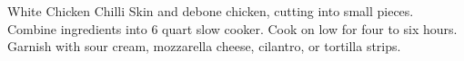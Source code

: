 \begin{recipe}{White Chicken Chilli}{}{}
Skin and debone chicken, cutting into small pieces.
Combine ingredients into 6 quart slow cooker. Cook on low for four to six hours.
Garnish with sour cream, mozzarella cheese, cilantro, or tortilla strips.
\end{recipe}
